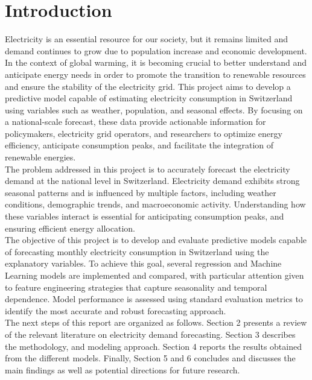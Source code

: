 \documentclass[11pt,a4paper]{article}
\begin{document}
\newpage
\tableofcontents
\newpage


\section{Introduction}
\label{sec:introduction}
Electricity is an essential resource for our society, but it remains limited and demand continues to grow due to population increase and economic development. In the context of global warming, it is becoming crucial to better understand and anticipate energy needs in order to promote the transition to renewable resources and ensure the stability of the electricity grid. This project aims to develop a predictive model capable of estimating electricity consumption in Switzerland using variables such as weather, population, and seasonal effects. By focusing on a national-scale forecast, these data provide actionable information for policymakers, electricity grid operators, and researchers to optimize energy efficiency, anticipate consumption peaks, and facilitate the integration of renewable energies.\\

The problem addressed in this project is to accurately forecast the electricity demand at the national level in Switzerland. Electricity demand exhibits strong seasonal patterns and is influenced by multiple factors, including weather conditions, demographic trends, and macroeconomic activity. Understanding how these variables interact is essential for anticipating consumption peaks, and ensuring efficient energy allocation. \\

The objective of this project is to develop and evaluate predictive models capable of forecasting monthly electricity consumption in Switzerland using the explanatory variables. To achieve this goal, several regression and Machine Learning models are implemented and compared, with particular attention given to feature engineering strategies that capture seasonality and temporal dependence. Model performance is assessed using standard evaluation metrics to identify the most accurate and robust forecasting approach.\\

The next steps of this report are organized as follows. Section 2 presents a review of the relevant literature on electricity demand forecasting. Section 3 describes the methodology, and modeling approach. Section 4 reports the results obtained from the different models. Finally, Section 5 and 6 concludes and discusses the main findings as well as potential directions for future research.
\end{document}
